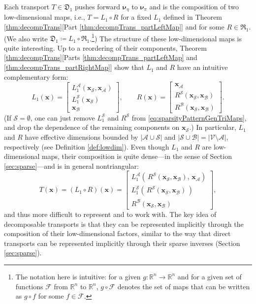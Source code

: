 \documentclass[twoside,11pt]{article}
\newcommand{\genm}{\boldsymbol{\nu} }   %
\newcommand{\re}{\mathbb{R}}
\newcommand{\ra}{\rightarrow}
\newcommand{\Bc}{\mathcal{B}}
\newcommand{\Vc}{\mathcal{V}}
\newcommand{\Fc}{\mathcal{F}}
\newcommand{\Ac}{\mathcal{A}}
\newcommand{\Sc}{\mathcal{S}}
\newcommand{\xb}{\boldsymbol{x}}
\newcommand{\lmap}{L} %
\newcommand{\rmap}{R} %
\newcommand{\decset}{\mathfrak{D}} %
\newcommand{\Aset}{ \Ac }
\newcommand{\Bset}{ \Bc }
\newcommand{\Sset}{ \Sc }
\begin{document}
Each transport $T \in \decset_1$ pushes forward $\genm_\eta$ to $\genm_\pi$ and is the composition of two low-dimensional maps, i.e., 
$T = \lmap_1 \circ \rmap$ for a fixed $\lmap_1$ defined in 
Theorem \ref{thm:decompTrans}[Part \ref{thm:decompTrans_partLeftMap}]
and for some $\rmap \in \mathfrak{R}_1$.
(We also write $\decset_1 \coloneqq \lmap_1 \circ \mathfrak{R}_1$.\footnote{
The notation here is intuitive: for a given $g:\re^n \ra \re^n$ and for a 
given set 
of functions $\Fc$ from $\re^n$ to $\re^n$, $g \circ \Fc$ denotes the set of
maps that can be written as $g \circ f$ for some $f \in \Fc$.   
})
The structure of these low-dimensional maps is quite interesting.  
Up to a reordering of their components, 
Theorem \ref{thm:decompTrans}[Parts \ref{thm:decompTrans_partLeftMap} and 
\ref{thm:decompTrans_partRightMap}] show that
$\lmap_1$ and $\rmap$ have an
intuitive complementary form:
\newcommand{\spacinglines}{2pt}
\begin{equation}  \label{eq:sparsityPatternGenTriMaps}
\lmap_1( \xb ) = \left[\begin{array}{l}
\lmap_1^{\Aset}( \xb_{\Sset} , \xb_{\Aset} )\\[\spacinglines] 
\lmap_1^{\Sset}(\xb_{\Sset})\\[\spacinglines] 
\xb_{\Bset} 
\end{array}\right],\qquad %
\rmap( \xb ) = \left[\begin{array}{l}
\xb_{\Aset}\\[\spacinglines] 
\rmap^{\Sset}(\xb_{\Sset},\xb_{\Bset})\\[\spacinglines] 
\rmap^{\Bset}(\xb_{\Sset},\xb_{\Bset}) 
\end{array}\right].
\end{equation}
%
%
%
%
%
%
%
%
(If $\Sset = \emptyset$, one can just remove $\lmap_1^{\Sset}$ and
$\rmap^{\Sset}$ from \eqref{eq:sparsityPatternGenTriMaps}, 
and drop the dependence of the remaining components
on $\xb_{\Sset}$.)
In particular, $\lmap_1$ and $\rmap$ have effective dimensions 
bounded by 
$|\Aset \cup \Sset|$ and $|\Sset \cup \Bset|=|\Vc \setminus \Ac|$, respectively (see Definition \ref{def:lowdim}). 
Even though $\lmap_1$ and $\rmap$ are low-dimensional maps, 
their composition is quite dense---in the sense of Section \ref{sec:sparse}---and is
in general nontriangular:
\begin{equation}   
T( \xb ) = (\lmap_1 \circ \rmap)(\xb) = 
\left[\begin{array}{l}
\lmap_1^{\Aset}(\, \rmap^{\Sset}(\xb_{\Sset},\xb_{\Bset}) , \,\xb_{\Aset} )\\[\spacinglines] 
\lmap_1^{\Sset}(\, \rmap^{\Sset}(\xb_{\Sset},\xb_{\Bset})\,)\\[\spacinglines] 
\rmap^{\Bset}(\xb_{\Sset},\xb_{\Bset}) 
\end{array}\right],
\end{equation}
and thus more difficult to represent and to work with.
The key idea of decomposable transports is that they can be represented
implicitly through the composition of their low-dimensional factors, similar to the way that 
direct transports can be represented implicitly
through their sparse inverses (Section \ref{sec:sparse}).
%
%
%
\end{document}
